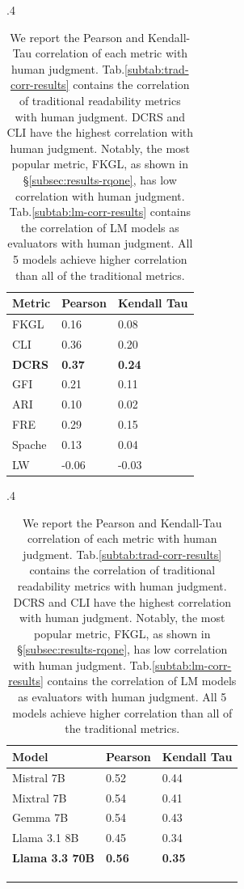 \begin{table}[!t]
\centering
    \begin{subtable}{.4\textwidth}
        \centering \footnotesize
        \begin{tabular}{l|ll}
            \textbf{Metric} & \textbf{Pearson} & \textbf{Kendall Tau} \\ \hline
             FKGL &  0.16 & 0.08 \\
            CLI & 0.36 & 0.20 \\
            \textbf{DCRS} & \textbf{0.37} & \textbf{0.24} \\
            GFI & 0.21 & 0.11 \\
            ARI & 0.10 & 0.02 \\
            FRE & 0.29 & 0.15 \\
            Spache & 0.13 & 0.04 \\
            LW & -0.06 & -0.03 \\
        \end{tabular}
        \caption{Traditional metric scores correlation with human judgment.}
        \label{subtab:trad-corr-results}
    \end{subtable}    
    \hspace{4mm}
    \begin{subtable}{.4\textwidth}
        \centering \footnotesize
            \begin{tabular}{l|ll}
            \textbf{Model} & \textbf{Pearson} & \textbf{Kendall Tau} \\ \hline
            Mistral 7B & 0.52 & 0.44 \\
            Mixtral 7B & 0.54 & 0.41 \\
            Gemma 7B & 0.54 & 0.43 \\
            Llama 3.1 8B & 0.45 & 0.34 \\
            \textbf{Llama 3.3 70B} & \textbf{0.56} & \textbf{0.35} \\
            \multicolumn{3}{l}{} \\
            \multicolumn{3}{l}{} \\
            \multicolumn{3}{l}{} \\
        \end{tabular}
        \caption{LM scores correlation with human judgment.}\label{subtab:lm-corr-results}
    \end{subtable} 
    \caption[Correlation of each readability metric with human judgment]{We report the Pearson and Kendall-Tau correlation of each metric with human judgment. Tab.\ref{subtab:trad-corr-results} contains the correlation of traditional readability metrics with human judgment. DCRS and CLI have the highest correlation with human judgment. Notably, the most popular metric, FKGL, as shown in \S\ref{subsec:results-rqone}, has low correlation with human judgment. Tab.\ref{subtab:lm-corr-results} contains the correlation of LM models as evaluators with human judgment. All 5 models achieve higher correlation than all of the traditional metrics.
    }
    \label{tab:corr-results}

\end{table}
